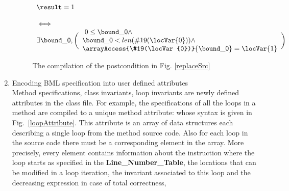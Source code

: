 \begin{enumerate}
\begin{figure}[t]
 $$\begin{array}{l}
         \result = 1 \\
          \\ 
         \iff \\ 
         \exists    \bound\_{\mbox{\rm \textsf{0}}}, 
           \biggl(\begin{array}{l} \ 0 \leq  \bound\_{\mbox{\rm \textsf{0}}} \wedge\\ 
             \bound\_{\mbox{\rm \textsf{0}}} < len(\#19(\locVar{0})) \wedge \\
             \arrayAccess{\#19(\locVar{0})}{\bound\_{\mbox{\rm \textsf{0}}} } = \locVar{1} 
         \end{array} \biggr) 
   \end{array}
$$
\caption{\sc The compilation of the postcondition in Fig. \ref{replaceSrc}}
\label{postCompile}
\end{figure}





\item Encoding BML specification  into user defined attributes\\
 Method specifications, class invariants, loop invariants are newly defined attributes in the class file.
 For example, the specifications of all the loops in a method are compiled to a unique method attribute: whose syntax is
 given in Fig.~\ref{loopAttribute}. This attribute is an array of data structures each describing a single loop from the method source code.
 Also for each loop in the source code there must be a corresponding element in the array. 
More precisely, every element contains information about the instruction where the loop starts as specified in the
\textbf{Line\_Number\_Table}, the locations that can be modified in a loop iteration, 
 the invariant associated to this loop and the decreasing expression in case of total correctness, 
\end{enumerate}

